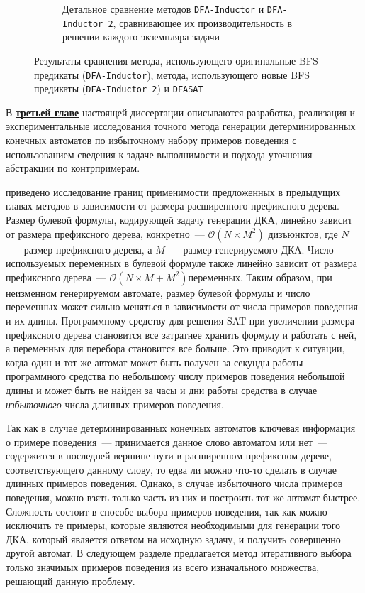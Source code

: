 \begin{figure}[ht]
\begin{subfigure}[b]{0.48\textwidth}
    \caption{Детальное сравнение методов \texttt{DFA-Inductor} и \texttt{DFA-Inductor~2}, сравнивающее их производительность в решении каждого экземпляра задачи}
    \label{syn:img:plots:scatter}
  \end{subfigure}
  \caption{Результаты сравнения метода, использующего оригинальные BFS предикаты (\texttt{DFA-Inductor}), метода, использующего новые BFS предикаты (\texttt{DFA-Inductor~2}) и \texttt{DFASAT}}
  \label{syn:img:plots}
\end{figure}


В \textbf{\underline{третьей главе}} настоящей диссертации описываются разработка, реализация и экспериментальные исследования точного метода генерации детерминированных конечных автоматов по избыточному набору примеров поведения с использованием сведения к задаче выполнимости и подхода уточнения абстракции по контрпримерам.

\insection{\ref{sec:cegar:motivation}} приведено исследование границ применимости предложенных в предыдущих главах методов в зависимости от размера расширенного префиксного дерева. 
Размер булевой формулы, кодирующей задачу генерации ДКА, линейно зависит от размера префиксного дерева, конкретно~--- $\mathcal{O}\left(N \times M^{2}\right)$ дизъюнктов, где $N$~--- размер префиксного дерева, а $M$~--- размер генерируемого ДКА.
Число используемых переменных в булевой формуле также линейно зависит от размера префиксного дерева~--- $\mathcal{O}\left(N \times M + M^{2}\right) переменных.$
Таким образом, при неизменном генерируемом автомате, размер булевой формулы и число переменных может сильно меняться в зависимости от числа примеров поведения и их длины.
Программному средству для решения SAT при увеличении размера префиксного дерева становится все затратнее хранить формулу и работать с ней, а переменных для перебора становится все больше.
Это приводит к ситуации, когда один и тот же автомат может быть получен за секунды работы программного средства по небольшому числу примеров поведения небольшой длины и может быть не найден за часы и дни работы средства в случае \emph{избыточного} числа длинных примеров поведения.

Так как в случае детерминированных конечных автоматов ключевая информация о примере поведения~--- принимается данное слово автоматом или нет~--- содержится в последней вершине пути в расширенном префиксном дереве, соответствующего данному слову, то едва ли можно что-то сделать в случае длинных примеров поведения.
Однако, в случае избыточного числа примеров поведения, можно взять только часть из них и построить тот же автомат быстрее.
Сложность состоит в способе выбора примеров поведения, так как можно исключить те примеры, которые являются необходимыми для генерации того ДКА, который является ответом на исходную задачу, и получить совершенно другой автомат.
В следующем разделе предлагается метод итеративного выбора только значимых примеров поведения из всего изначального множества, решающий данную проблему.

